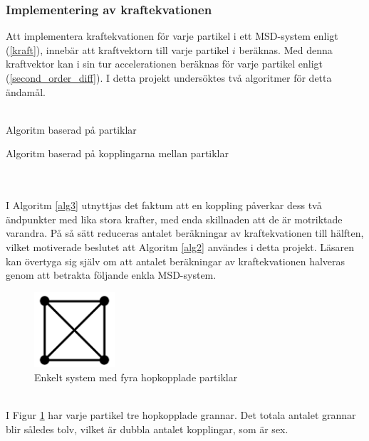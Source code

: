 \documentclass[a4paper,12pt,oneside,final,swedish]{extarticle}
\begin{document}
\subsubsection{Implementering av kraftekvationen}
Att implementera kraftekvationen för varje partikel i ett MSD-system enligt (\ref{kraft}), innebär att kraftvektorn till varje partikel $i$ beräknas. Med denna kraftvektor kan i sin tur accelerationen beräknas för varje partikel enligt (\ref{second_order_diff}). I detta projekt undersöktes två algoritmer för detta ändamål.\\\\
\begin{algorithm}[H]
\caption{Algoritm baserad på partiklar\label{alg2}}
\end{algorithm}
\begin{algorithm}[H]
\caption{Algoritm baserad på kopplingarna mellan partiklar\label{alg3}}
\end{algorithm}
\noindent \\\\I Algoritm \ref{alg3} utnyttjas det faktum att en koppling påverkar dess två ändpunkter med lika stora krafter, med enda skillnaden att de är motriktade varandra. På så sätt reduceras antalet beräkningar av kraftekvationen till hälften, vilket motiverade beslutet att Algoritm \ref{alg2} användes i detta projekt. Läsaren kan övertyga sig själv om att antalet beräkningar av kraftekvationen halveras genom att betrakta följande enkla MSD-system.
\begin{figure}[h!]
  \begin{center}
    \includegraphics[width=3cm]{Bilder/2D_2x2.png} 
  \end{center}
  \caption{Enkelt system med fyra hopkopplade partiklar}
  \label{enkelfyra::nonfloat}
\end{figure}
\\I Figur \ref{enkelfyra::nonfloat} har varje partikel tre hopkopplade grannar. Det totala antalet grannar blir således tolv, vilket är dubbla antalet kopplingar, som är sex.
\end{document}
